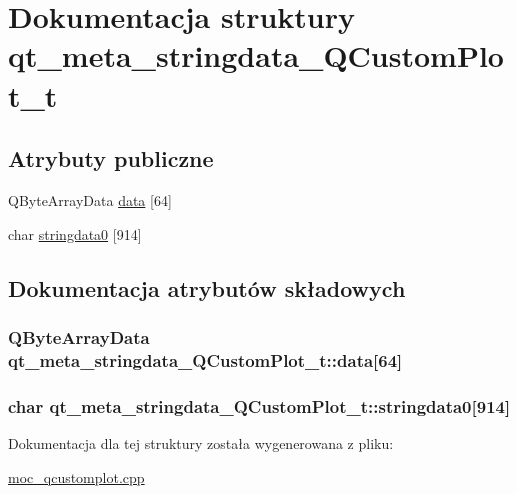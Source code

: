 \hypertarget{structqt__meta__stringdata___q_custom_plot__t}{}\section{Dokumentacja struktury qt\+\_\+meta\+\_\+stringdata\+\_\+\+Q\+Custom\+Plot\+\_\+t}
\label{structqt__meta__stringdata___q_custom_plot__t}
\subsection*{Atrybuty publiczne}
\begin{DoxyCompactItemize}
\item 
Q\+Byte\+Array\+Data \hyperlink{structqt__meta__stringdata___q_custom_plot__t_a8977178dafbbe5777e63d644f3bf262a}{data} \mbox{[}64\mbox{]}
\item 
char \hyperlink{structqt__meta__stringdata___q_custom_plot__t_ad63fb62139acbe99179838dc5bd42bbb}{stringdata0} \mbox{[}914\mbox{]}
\end{DoxyCompactItemize}


\subsection{Dokumentacja atrybutów składowych}
\subsubsection[{\texorpdfstring{data}{data}}]{\setlength{\rightskip}{0pt plus 5cm}Q\+Byte\+Array\+Data qt\+\_\+meta\+\_\+stringdata\+\_\+\+Q\+Custom\+Plot\+\_\+t\+::data\mbox{[}64\mbox{]}}\hypertarget{structqt__meta__stringdata___q_custom_plot__t_a8977178dafbbe5777e63d644f3bf262a}{}\label{structqt__meta__stringdata___q_custom_plot__t_a8977178dafbbe5777e63d644f3bf262a}
\subsubsection[{\texorpdfstring{stringdata0}{stringdata0}}]{\setlength{\rightskip}{0pt plus 5cm}char qt\+\_\+meta\+\_\+stringdata\+\_\+\+Q\+Custom\+Plot\+\_\+t\+::stringdata0\mbox{[}914\mbox{]}}\hypertarget{structqt__meta__stringdata___q_custom_plot__t_ad63fb62139acbe99179838dc5bd42bbb}{}\label{structqt__meta__stringdata___q_custom_plot__t_ad63fb62139acbe99179838dc5bd42bbb}


Dokumentacja dla tej struktury została wygenerowana z pliku\+:\begin{DoxyCompactItemize}
\item 
\hyperlink{moc__qcustomplot_8cpp}{moc\+\_\+qcustomplot.\+cpp}\end{DoxyCompactItemize}
